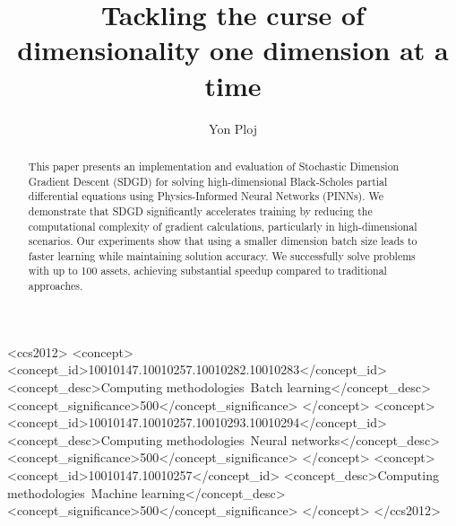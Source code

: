 \documentclass[manuscript,screen,review,acmtog]{acmart}
\begin{document}
\title{Tackling the curse of dimensionality one dimension at a time}

\author{Yon Ploj}

\renewcommand{\shortauthors}{Ploj, Y.}

\begin{abstract}
This paper presents an implementation and evaluation of Stochastic Dimension Gradient Descent (SDGD)
for solving high-dimensional Black-Scholes partial differential equations using
Physics-Informed Neural Networks (PINNs).
We demonstrate that SDGD significantly accelerates training by reducing the
computational complexity of gradient calculations, particularly in high-dimensional scenarios.
Our experiments show that using a smaller dimension batch size leads to faster learning
while maintaining solution accuracy. We successfully solve problems with up to 100 assets,
achieving substantial speedup compared to traditional approaches.
\end{abstract}

\begin{CCSXML}
<ccs2012>
<concept>
<concept_id>10010147.10010257.10010282.10010283</concept_id>
<concept_desc>Computing methodologies~Batch learning</concept_desc>
<concept_significance>500</concept_significance>
</concept>
<concept>
<concept_id>10010147.10010257.10010293.10010294</concept_id>
<concept_desc>Computing methodologies~Neural networks</concept_desc>
<concept_significance>500</concept_significance>
</concept>
<concept>
<concept_id>10010147.10010257</concept_id>
<concept_desc>Computing methodologies~Machine learning</concept_desc>
<concept_significance>500</concept_significance>
</concept>
</ccs2012>
\end{CCSXML}


\end{document}
